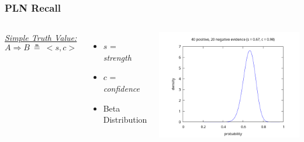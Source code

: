 \documentclass[aspectratio=169]{beamer}
\newcommand{\limp}{\Rightarrow}
\newcommand{\STV}[2]{<\!#1, #2\!>}
\begin{document}
\begin{frame}
  \frametitle{PLN Recall}
  \begin{columns}
    \column{5cm}
    \underline{\emph{Simple Truth Value:}}
    $$A \limp B\ \measeq\ \STV{s}{c}$$
    \begin{itemize}
    \item $s$ = \emph{strength}
    \item $c$ = \emph{confidence}
    \item Beta Distribution
    \end{itemize}
    \column{10cm}
    \includegraphics[scale=0.4]{figs/observations_20_40.png}
  \end{columns}
\end{frame}
\end{document}
